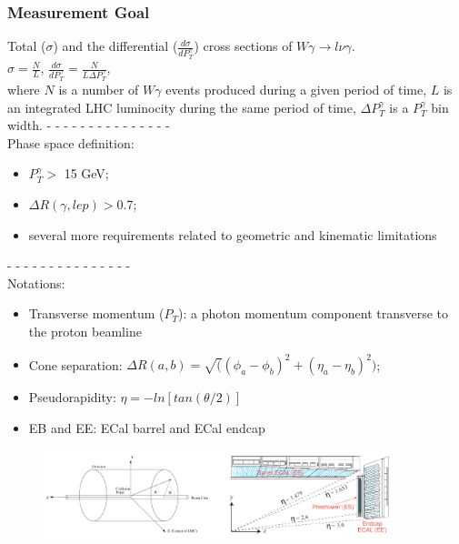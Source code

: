 \begin{frame}\frametitle{Measurement Goal}
  \scriptsize
  Total ($\sigma$) and the differential ($\frac{d\sigma}{dP_T^{\gamma}}$) cross sections of $W\gamma\rightarrow l\nu\gamma$.\\
  $\sigma = \frac{N}{L}$, $\frac{d\sigma}{dP_T^{\gamma}} = \frac{N}{L \Delta P_T^{\gamma}}$, \\
  \tiny
  where $N$ is a number of $W\gamma$ events produced during a given period of time, $L$ is an integrated LHC luminocity during the same period of time, $\Delta P_T^{\gamma}$ is a $P_T^{\gamma}$ bin width.
  \scriptsize
  - - - - - - - - - - - - - - - \\
  Phase space definition:
  \begin{itemize}
    \scriptsize
    \item $P_T^{\gamma}>$ 15 GeV;
    \item $\Delta{R}(\gamma,lep) > $0.7;
    \item several more requirements related to geometric and kinematic limitations
  \end{itemize}
  - - - - - - - - - - - - - - - \\
  \tiny
  Notations:
  \begin{itemize}
    \tiny
    \item Transverse momentum ($P_T$):  a photon momentum component transverse to the proton beamline
    \item Cone separation: $\Delta R(a,b) = \sqrt( (\phi_a-\phi_b)^2 + (\eta_a-\eta_b)^2 )$;
    \item Pseudorapidity: $\eta=-ln \left[ tan{(\theta/2)} \right]$
    \item EB and EE: ECal barrel and ECal endcap
  \end{itemize}
\begin{figure}[htb]
  \begin{center}
    {\includegraphics[width=0.90\textwidth]{../figs/ForPresentation/CMS_coordSyst_and_ECal.png}}
  \end{center}
\end{figure}
\end{frame}%

